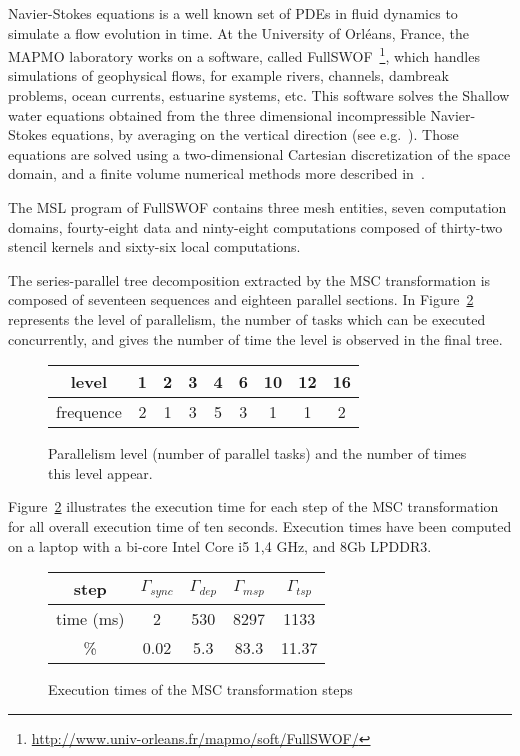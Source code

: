 Navier-Stokes equations is a well known set of PDEs in fluid dynamics to simulate a flow evolution in time. At the University of Orl\'eans, France, the MAPMO laboratory works on a software, called FullSWOF~\footnote{\url{http://www.univ-orleans.fr/mapmo/soft/FullSWOF/}}, which handles simulations of geophysical flows, for example rivers, channels, dambreak problems, ocean currents, estuarine systems, etc. This software solves the Shallow water equations obtained from the three dimensional incompressible Navier-Stokes equations, by averaging on the vertical direction (see e.g.~\cite{Ferrari2004}). Those equations are solved using a two-dimensional Cartesian discretization of the space domain, and a finite volume numerical methods more described in~\cite{HeleneLS13}.

The MSL program of FullSWOF contains three mesh entities, seven computation domains, fourty-eight data and ninty-eight computations composed of thirty-two stencil kernels and sixty-six local computations.

The series-parallel tree decomposition extracted by the MSC transformation is composed of seventeen sequences and eighteen parallel sections. In Figure~\ref{fig:freq} represents the level of parallelism, \ie the number of tasks which can be executed concurrently, and gives the number of time the level is observed in the final tree.

\begin{figure}[!h]
 \begin{center}
 \begin{tabular}{c|c|c|c|c|c|c|c|c|}
   level & 1 & 2 & 3 & 4 & 6 & 10 & 12 & 16\\
   \hline
   frequence & 2 & 1 & 3 & 5 & 3 & 1 & 1 & 2\\
 \end{tabular}
\caption{Parallelism level (number of parallel tasks) and the number of times this level appear.}
\label{fig:freq}
 \end{center}
\end{figure}

Figure~\ref{fig:freq} illustrates the execution time for each step of the MSC transformation for all overall execution time of ten seconds. Execution times have been computed on a laptop with a bi-core Intel Core i5 1,4 GHz, and 8Gb LPDDR3. 

\begin{figure}[!h]
 \begin{center}
 \begin{tabular}{c|c|c|c|c|}
   step & $\Gamma_{sync}$ & $\Gamma_{dep}$ & $\Gamma_{msp}$ & $\Gamma_{tsp}$\\
   \hline
   time (ms) & 2 & 530 & 8297 & 1133\\
   \hline
   \% & 0.02 & 5.3 & 83.3 & 11.37\\
 \end{tabular}
\caption{Execution times of the MSC transformation steps}
\label{fig:freq}
 \end{center}
\end{figure}

